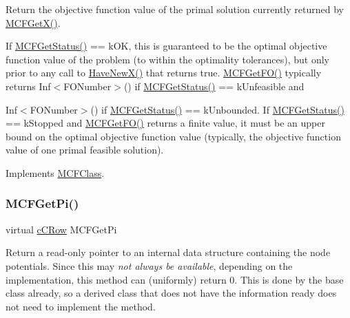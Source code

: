 Return the objective function value of the primal solution currently returned by \mbox{\hyperlink{class_m_c_f_class_a4eb307e0707adaef99bb0e08c9e10eb8}{M\+C\+F\+Get\+X()}}.

If \mbox{\hyperlink{class_m_c_f_class_a333e27ad7a73779b096cb70829cbe8be}{M\+C\+F\+Get\+Status()}} == k\+OK, this is guaranteed to be the optimal objective function value of the problem (to within the optimality tolerances), but only prior to any call to \mbox{\hyperlink{class_m_c_f_class_a7a4966a98c7ffa909057064beb4507a5}{Have\+New\+X()}} that returns true. \mbox{\hyperlink{class_m_c_f_simplex_a854a2b3ad7bb3cca0326c8f581a2d673}{M\+C\+F\+Get\+F\+O()}} typically returns Inf$<$\+F\+O\+Number$>$() if \mbox{\hyperlink{class_m_c_f_class_a333e27ad7a73779b096cb70829cbe8be}{M\+C\+F\+Get\+Status()}} == k\+Unfeasible and
\begin{DoxyItemize}
\item Inf$<$\+F\+O\+Number$>$() if \mbox{\hyperlink{class_m_c_f_class_a333e27ad7a73779b096cb70829cbe8be}{M\+C\+F\+Get\+Status()}} == k\+Unbounded. If \mbox{\hyperlink{class_m_c_f_class_a333e27ad7a73779b096cb70829cbe8be}{M\+C\+F\+Get\+Status()}} == k\+Stopped and \mbox{\hyperlink{class_m_c_f_simplex_a854a2b3ad7bb3cca0326c8f581a2d673}{M\+C\+F\+Get\+F\+O()}} returns a finite value, it must be an upper bound on the optimal objective function value (typically, the objective function value of one primal feasible solution). 
\end{DoxyItemize}

Implements \mbox{\hyperlink{class_m_c_f_class_a109d7c021feda837d8ca5051fc24b6ea}{M\+C\+F\+Class}}.

\mbox{\label{class_m_c_f_simplex_a8f1a95d5c707f83ffc6aecba1e7e0e10}} 
\subsubsection{\texorpdfstring{M\+C\+F\+Get\+Pi()}{MCFGetPi()}\hspace{0.1cm}{\footnotesize\ttfamily [1/3]}}
{\footnotesize\ttfamily virtual \mbox{\hyperlink{class_m_c_f_class_ab700102e9ba8bb6015be6818d4e99097}{c\+C\+Row}} M\+C\+F\+Get\+Pi\hspace{0.3cm}{\ttfamily [inline]}}

Return a read-\/only pointer to an internal data structure containing the node potentials. Since this may {\itshape not always be available}, depending on the implementation, this method can (uniformly) return 0. This is done by the base class already, so a derived class that does not have the information ready does not need to implement the method. \mbox{\label{class_m_c_f_simplex_a8c573c04800332c86ea31aeb80bbd7b1}} 
